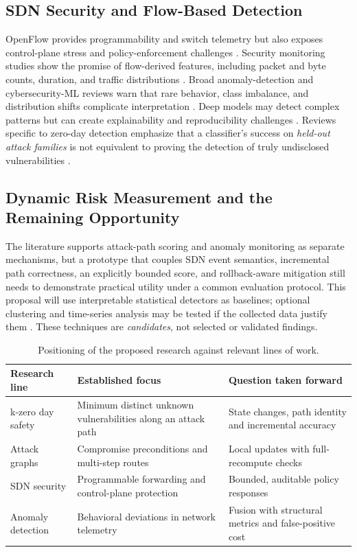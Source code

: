 \documentclass[12pt,a4paper,oneside]{article}
\begin{document}
\subsection{SDN Security and Flow-Based Detection}
OpenFlow provides programmability and switch telemetry but also exposes control-plane stress and policy-enforcement challenges \cite{mckeown2008openflow,shin2013avantguard}. Security monitoring studies show the promise of flow-derived features, including packet and byte counts, duration, and traffic distributions \cite{dey2020sdn,sultana2019survey}. Broad anomaly-detection and cybersecurity-ML reviews warn that rare behavior, class imbalance, and distribution shifts complicate interpretation \cite{chandola2009anomaly,buczak2016survey}. Deep models may detect complex patterns but can create explainability and reproducibility challenges \cite{lecun2015deep,faezi2023survey}. Reviews specific to zero-day detection emphasize that a classifier's success on \emph{held-out attack families} is not equivalent to proving the detection of truly undisclosed vulnerabilities \cite{guo2023zeroday}.

\subsection{Dynamic Risk Measurement and the Remaining Opportunity}
The literature supports attack-path scoring and anomaly monitoring as separate mechanisms, but a prototype that couples SDN event semantics, incremental path correctness, an explicitly bounded score, and rollback-aware mitigation still needs to demonstrate practical utility under a common evaluation protocol. This proposal will use interpretable statistical detectors as baselines; optional clustering and time-series analysis may be tested if the collected data justify them \cite{macqueen1967methods,box2015timeseries,estan2002traffic}. These techniques are \emph{candidates}, not selected or validated findings.

\begin{table}[htbp]
\centering\small
\caption{Positioning of the proposed research against relevant lines of work.}\label{tab:position}
\begin{tabularx}{\textwidth}{@{}p{32mm}X X@{}}
\toprule
\textbf{Research line} & \textbf{Established focus} & \textbf{Question taken forward}\\\midrule
k-zero day safety \cite{wang2014kzero} & Minimum distinct unknown vulnerabilities along an attack path & State changes, path identity and incremental accuracy \\
Attack graphs \cite{zenitani2023attack} & Compromise preconditions and multi-step routes & Local updates with full-recompute checks \\
SDN security \cite{shin2013avantguard} & Programmable forwarding and control-plane protection & Bounded, auditable policy responses \\
Anomaly detection \cite{dey2020sdn} & Behavioral deviations in network telemetry & Fusion with structural metrics and false-positive cost \\
\bottomrule
\end{tabularx}
\end{table}
\end{document}

